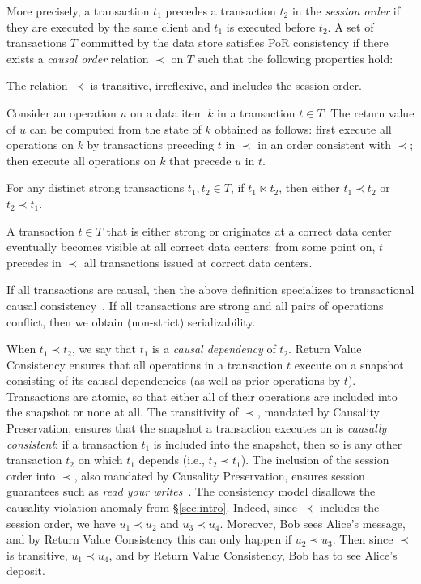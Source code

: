 More precisely, a transaction $t_1$ precedes a transaction $t_2$ in the {\em
  session order} if they are executed by the same client and $t_1$ is executed
before $t_2$. A set of transactions $T$ committed by the data store satisfies
PoR
consistency if there exists a {\em causal order}
relation $\prec$ on $T$ such that the following properties hold:
\begin{description}[noitemsep,topsep=3pt,parsep=3pt,leftmargin=10pt]
\item[Causality Preservation.] The relation $\prec$ is transitive, irreflexive,
  and includes the session order.
\item[Return Value Consistency.] Consider an operation $u$ on a data item $k$ in
  a transaction $t \in T$. The return value of $u$ can be computed from the
  state of $k$ obtained as follows: first execute
  all operations on $k$ by transactions preceding $t$ in $\prec$ in an order
  consistent with $\prec$; then execute
  all operations on $k$ that precede $u$ in $t$.
\item[Conflict Ordering.] For any distinct strong transactions $t_1, t_2 \in T$,
  if $t_1\bowtie t_2$, then either $t_1\prec t_2$ or $t_2\prec t_1$.
\item[Eventual Visibility.] A transaction $t \in T$ that is either strong or
  originates at a correct data center eventually becomes visible at all correct
  data centers: from some point on, $t$ precedes in $\prec$ all transactions
  issued at correct data centers.
\end{description}
If all transactions are causal, then the above definition specializes to
transactional causal consistency~\cite{cure,framework-concur15}. If all
transactions are strong and all pairs of operations conflict, then we obtain
(non-strict) serializability.

When $t_1 \prec t_2$, we say that $t_1$ is a {\em causal dependency} of $t_2$.
Return Value Consistency ensures that all operations in a transaction $t$
execute on a snapshot consisting of its causal dependencies (as well as prior
operations by $t$). Transactions are atomic, so that either all of their
operations are included into the snapshot or none at all. The transitivity of
$\prec$, mandated by Causality Preservation, ensures that the snapshot a
transaction executes on is \emph{causally consistent}: if a transaction $t_1$ is
included into the snapshot, then so is any other transaction $t_2$ on which
$t_1$ depends (i.e., $t_2\prec t_1$). The inclusion of the session order into
$\prec$, also mandated by Causality Preservation, ensures session guarantees
such as {\em read your writes}~\cite{session}. The consistency model disallows
the causality violation anomaly from \S\ref{sec:intro}. Indeed, since $\prec$
includes the session order, we have $u_1 \prec u_2$ and $u_3 \prec
u_4$. Moreover, Bob sees Alice's message, and by Return Value Consistency this
can only happen if $u_2 \prec u_3$. Then since $\prec$ is transitive,
$u_1 \prec u_4$, and by Return Value Consistency, Bob has to see Alice's
deposit.

